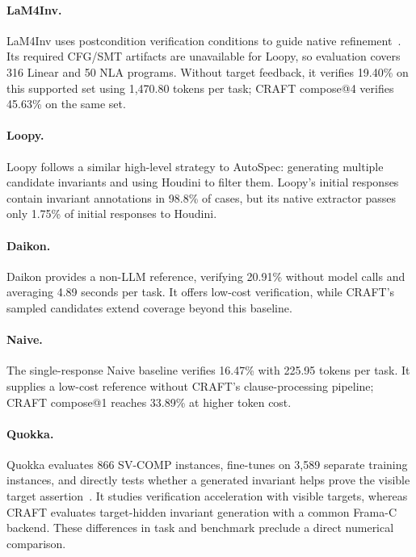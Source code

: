 \paragraph{LaM4Inv.}
LaM4Inv uses postcondition verification conditions to guide native
refinement~\citep{wu2024lam4inv}. Its required CFG/SMT artifacts are
unavailable for Loopy, so evaluation covers 316 Linear and 50 NLA programs.
Without target feedback, it verifies 19.40\% on this supported set using
1,470.80 tokens per task; CRAFT compose@4 verifies 45.63\% on the same set.

\paragraph{Loopy.}
Loopy follows a similar high-level strategy to AutoSpec: generating multiple
candidate invariants and using Houdini to filter them.
Loopy's initial responses contain invariant annotations in 98.8\% of cases,
but its native extractor passes only 1.75\% of initial responses to Houdini.

\paragraph{Daikon.}
Daikon provides a non-LLM reference, verifying 20.91\% without model calls
and averaging 4.89 seconds per task. It offers low-cost verification, while
CRAFT's sampled candidates extend coverage beyond this baseline.

\paragraph{Naive.}
The single-response Naive baseline verifies 16.47\% with 225.95 tokens per
task. It supplies a low-cost reference without CRAFT's clause-processing
pipeline; CRAFT compose@1 reaches 33.89\% at higher token cost.

\paragraph{Quokka.}
Quokka evaluates 866
SV-COMP instances, fine-tunes on 3,589 separate training instances, and
directly tests whether a generated invariant helps prove the visible target
assertion~\citep{wei2026quokka}. It studies verification acceleration with
visible targets, whereas CRAFT evaluates target-hidden invariant generation
with a common Frama-C backend. These differences in task and benchmark
preclude a direct numerical comparison.

